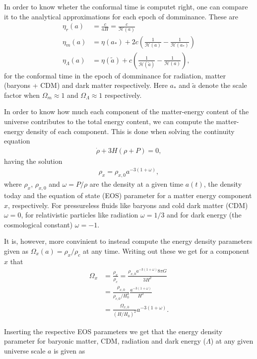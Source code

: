 \documentclass[twocolumn]{aastex62}
\begin{document}
In order to know wheter the conformal time is computet right, one can compare it
to the analytical approximations for each epoch of domminance. These are 
\begin{align}
    \eta_r(a) &= \frac{c}{aH} = \frac{c}{\mathcal{H}(a)}\\
    \eta_m(a) &= \eta(a_*) + 2c\left(\frac{1}{\mathcal{H}(a)} - \frac{1}{\mathcal{H}(a_*)}\right)\\
    \eta_\Lambda(a) &= \eta(\tilde{a}) + c\left(\frac{1}{\mathcal{H}(\tilde{a})} - \frac{1}{\mathcal{H}(a)}\right),
\end{align}
for the conformal time in the epoch of domminance for radiation, matter (baryons
+ CDM) and dark matter respectively. Here $a_*$ and $\tilde{a}$ denote the scale
factor when $\Omega_m \approx 1$ and $\Omega_\Lambda \approx 1$ respectively.

In order to know how much each component of the matter-energy content of the
universe contributes to the total energy content, we can compute the
matter-energy density of each component. This is done when solving the
continuity equation 
\begin{align}
    \dot{\rho} + 3H(\rho + P) = 0,
\end{align}
having the solution 
\begin{align}
    \rho_{x} = \rho_{x,0} a^{-3(1+\omega)},
\end{align}
where $\rho_x$, $\rho_{x,0}$ and $\omega = P/\rho$ are the density at a given
time $a(t)$, the density today and the equation of state (EOS) parameter for a
matter energy component $x$, respectively. For pressureless fluids like baryons
and cold dark matter (CDM) $\omega = 0$, for relativistic particles like
radiation $\omega = 1/3$ and for dark energy (the cosmological constant) $\omega
= -1$. 

It is, however, more convinient to instead compute the energy density parameters
given as 
$\Omega_x(a) = \rho_x / \rho_c$ at any time. Writing out these we get for a
component $x$ that 
\begin{align}
    \Omega_x &= \frac{\rho_x}{\rho_c} = \frac{\rho_{x,0}a^{-3(1+\omega)} 8\pi G}{3 H^2} \\
   &= \frac{\rho_{x,0}}{\rho_{c,0}/H_0^2} \frac{a^{-3(1+\omega)}}{H^2} \\ 
   &= \frac{\Omega_{x,0}}{(H/H_0)^2} a^{-3(1+\omega)}.
\end{align}

Inserting the respective EOS parameters we get that the energy density parameter
for baryonic matter, CDM, radiation and dark energy ($\Lambda$)
at any given universe scale $a$ is given as
\end{document}
